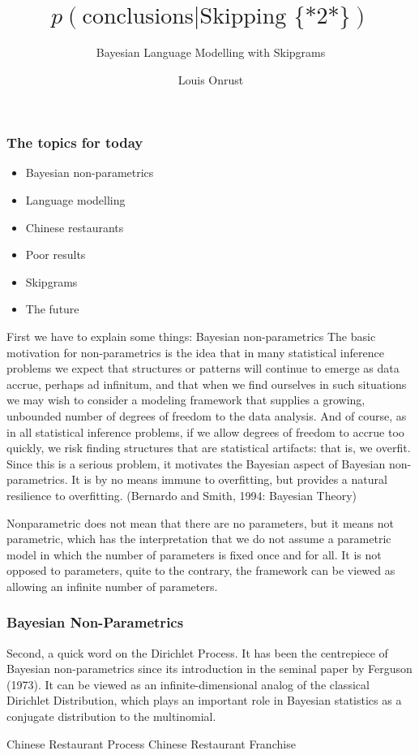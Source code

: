 \documentclass{beamer}
\author{Louis Onrust}
\title{$p(\text{conclusions} | \text{Skipping \{*2*\}})$}
\subtitle{Bayesian Language Modelling with Skipgrams}
\date{}
\begin{document}
\begin{frame}
	\titlepage
\end{frame}

\begin{frame}
    \frametitle{The topics for today}
    \begin{itemize}
        \item Bayesian non-parametrics
        \item Language modelling
        \item Chinese restaurants
        \item Poor results
        \item Skipgrams
        \item The future
    \end{itemize}
\end{frame}

First we have to explain some things:
Bayesian non-parametrics
    The basic motivation for non-parametrics is the idea that in many statistical inference problems we expect that structures or patterns will continue to emerge as data accrue, perhaps ad infinitum, and that when we find ourselves in such situations we may wish to consider a modeling framework that supplies a growing, unbounded number of degrees of freedom to the data analysis. And of course, as in all statistical inference problems, if we allow degrees of freedom to accrue too quickly, we risk finding structures that are statistical artifacts: that is, we overfit. Since this is a serious problem, it motivates the Bayesian aspect of Bayesian non-parametrics. It is by no means immune to overfitting, but provides a natural resilience to overfitting. (Bernardo and Smith, 1994: Bayesian Theory)

Nonparametric does not mean that there are no parameters, but it means not parametric, which has the interpretation that we do not assume a parametric model in which the number of parameters is fixed once and for all. It is not opposed to parameters, quite to the contrary, the framework can be viewed as allowing an infinite number of parameters.

\begin{frame}
    \frametitle{Bayesian Non-Parametrics}
    
\end{frame}

Second, a quick word on the Dirichlet Process. It has been the centrepiece of Bayesian non-parametrics since its introduction in the seminal paper by Ferguson (1973). It can be viewed as an infinite-dimensional analog of the classical Dirichlet Distribution, which plays an important role in Bayesian statistics as a conjugate distribution to the multinomial.

\begin{frame}

\end{frame}

\begin{frame}
Chinese Restaurant Process
Chinese Restaurant Franchise
\end{frame}
\end{document}
